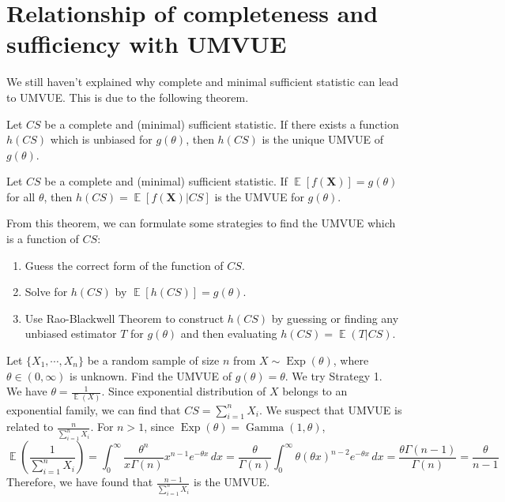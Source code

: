 \documentclass{huhtakm-template-book-v2}
\DeclareMathOperator{\E}{\mathbb{E}}
\DeclareMathOperator{\Exp}{Exp}
\DeclareMathOperator{\Gam}{Gamma}
\begin{document}
\section{Relationship of completeness and sufficiency with UMVUE}
We still haven't explained why complete and minimal sufficient statistic can lead to UMVUE. This is due to the following theorem.
\begin{thm} Let $CS$ be a complete and (minimal) sufficient statistic. If there exists a function $h(CS)$ which is unbiased for $g(\theta)$, then $h(CS)$ is the unique UMVUE of $g(\theta)$.
\end{thm}
\begin{thm}
	Let $CS$ be a complete and (minimal) sufficient statistic. If $\E[f(\mathbf{X})]=g(\theta)$ for all $\theta$, then $h(CS)=\E[f(\mathbf{X})|CS]$ is the UMVUE for $g(\theta)$.
\end{thm}
\begin{rem}
	From this theorem, we can formulate some strategies to find the UMVUE which is a function of $CS$:
	\begin{enumerate}
		\item Guess the correct form of the function of $CS$.
		\item Solve for $h(CS)$ by $\E[h(CS)]=g(\theta)$.
		\item Use Rao-Blackwell Theorem to construct $h(CS)$ by guessing or finding any unbiased estimator $T$ for $g(\theta)$ and then evaluating $h(CS)=\E(T|CS)$.
	\end{enumerate}
\end{rem}
\begin{eg}
	\label{Chapter 3 (Example) UMVUE of Exp(theta)}
	Let $\{X_{1},\cdots,X_{n}\}$ be a random sample of size $n$ from $X\sim\Exp(\theta)$, where $\theta\in(0,\infty)$ is unknown. Find the UMVUE of $g(\theta)=\theta$. We try Strategy 1.\\
	We have $\theta=\frac{1}{\E(X)}$. Since exponential distribution of $X$ belongs to an exponential family, we can find that $CS=\sum_{i=1}^{n}X_{i}$. We suspect that UMVUE is related to $\frac{n}{\sum_{i=1}^{n}X_{i}}$. For $n>1$, since $\Exp(\theta)=\Gam(1,\theta)$,
	\begin{equation*}
		\E\left(\frac{1}{\sum_{i=1}^{n}X_{i}}\right)=\int_{0}^{\infty}\frac{\theta^{n}}{x\Gamma(n)}x^{n-1}e^{-\theta x}\,dx=\frac{\theta}{\Gamma(n)}\int_{0}^{\infty}\theta(\theta x)^{n-2}e^{-\theta x}\,dx=\frac{\theta\Gamma(n-1)}{\Gamma(n)}=\frac{\theta}{n-1}
	\end{equation*}
	Therefore, we have found that $\frac{n-1}{\sum_{i=1}^{n}X_{i}}$ is the UMVUE.
\end{eg}
\end{document}
